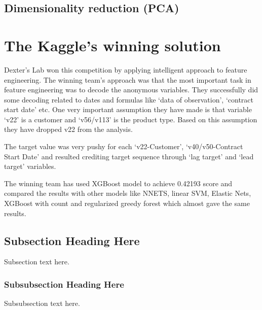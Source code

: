 \documentclass[conference, onecolumn]{IEEEtran}
\begin{document}
\subsection{Dimensionality reduction (PCA)}


\section{The Kaggle's winning solution}
Dexter’s Lab won this competition by applying intelligent approach to feature engineering.  The winning team's approach was that the most important task in feature engineering was to decode the anonymous variables. They successfully did some decoding related to dates and formulas like ‘data of observation’, ‘contract start date’ etc. One very important assumption they have made is that variable ‘v22’ is a customer and ‘v56/v113’ is the product type. Based on this assumption they have dropped v22 from the analysis.

The target value was very pushy for each ‘v22-Customer’, ‘v40/v50-Contract Start Date’ and resulted crediting target sequence through ‘lag target’ and ‘lead target’ variables. 

The winning team has used XGBoost model to achieve 0.42193 score and compared the results with other models like NNETS, linear SVM, Elastic Nets, XGBoost with count and regularized greedy forest which almost gave the same results.


\subsection{Subsection Heading Here}
Subsection text here.


\subsubsection{Subsubsection Heading Here}
Subsubsection text here.


%
%
\end{document}

